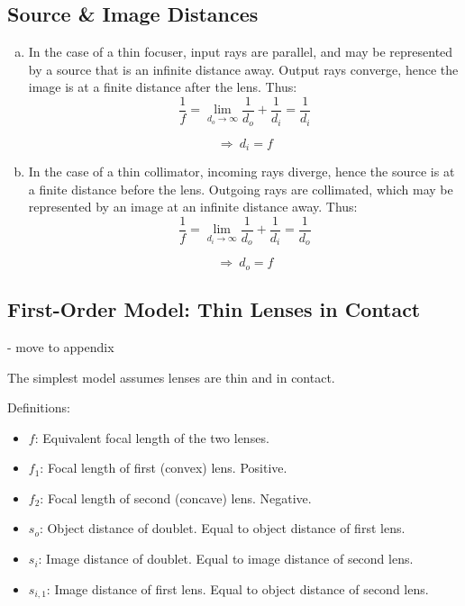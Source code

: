\subsection{Source \& Image Distances}
\begin{enumerate}[(a)]
    \item In the case of a thin focuser, input rays are parallel, and may be represented by a source that is an infinite distance away. Output rays converge, hence the image is at a finite distance after the lens. Thus:
    \begin{equation}
        \frac{1}{f} = \lim_{d_o\to\infty} \frac{1}{d_o} + \frac{1}{d_i} = \frac{1}{d_i}
    \end{equation}
    
    \begin{equation} \label{eq:image-distance}
        \Rightarrow \ \boxed{d_i = f}    
    \end{equation}
    
    \item In the case of a thin collimator, incoming rays diverge, hence the source is at a finite distance before the lens. Outgoing rays are collimated, which may be represented by an image at an infinite distance away. Thus:
    \begin{equation}
        \frac{1}{f} = \lim_{d_i\to\infty} \frac{1}{d_o} + \frac{1}{d_i} = \frac{1}{d_o}
    \end{equation}
    
    \begin{equation} \label{eq:source-distance}
        \Rightarrow \ \boxed{d_o = f}
    \end{equation}
\end{enumerate}

\subsection{First-Order Model: Thin Lenses in Contact} - move to appendix

The simplest model assumes lenses are thin and in contact.

Definitions:
\begin{itemize}
    \item $f$: Equivalent focal length of the two lenses.
    \item $f_1$: Focal length of first (convex) lens. Positive.
    \item $f_2$: Focal length of second (concave) lens. Negative.
    \item $s_o$: Object distance of doublet. Equal to object distance of first lens.
    \item $s_i$: Image distance of doublet. Equal to image distance of second lens.
    \item $s_{i,1}$: Image distance of first lens. Equal to object distance of second lens.
\end{itemize}


